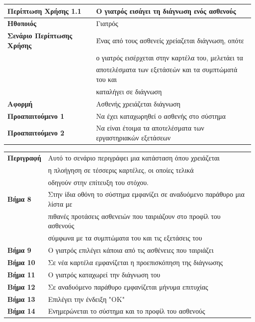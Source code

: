 \documentclass{article}
\newcommand\T{\rule{0pt}{2.6ex}}       %
\newcommand\B{\rule[-1.2ex]{0pt}{0pt}}
\begin{document}
 \begin{center}
     \begin{tabular}{|l|l|}
     \hline
      \textbf{Περίπτωση Χρήσης 1.1} & Ο γιατρός εισάγει τη διάγνωση ενός ασθενούς \T\B \\ 
      \hline
      \textbf{Ηθοποιός} & Γιατρός \T\B \\
      \hline
      \textbf{Σενάριο Περίπτωσης Χρήσης} & Ένας από τους ασθενείς χρείαζεται διάγνωση, οπότε \T\\& ο γιατρός εισέρχεται στην καρτέλα του, μελετάει τα\\& αποτελέσματα των εξετάσεών και τα συμπτώματά του και \\& καταλήγει σε διάγνωση \B \\
      \hline
      \textbf{Αφορμή} & Ασθενής χρειάζεται διάγνωση \T\B \\
      \hline
      \textbf{Προαπαιτούμενο 1} & Να έχει καταχωρηθεί ο ασθενής στο σύστημα \T\B \\
      \hline
      \textbf{Προαπαιτούμενο 2} & Να είναι έτοιμα τα αποτελέσματα των εργαστηριακών εξετάσεων \T\B \\
      \hline
     \end{tabular}
 \end{center}
 
  \vspace{0.2cm}
 
 \begin{center}
     \begin{tabular}{|l|l|}
     \hline
      \textbf{Περιγραφή} & Αυτό το σενάριο περιγράφει μια κατάσταση όπου χρειάζεται \T \\& η πλοήγηση σε τέσσερις καρτέλες, οι οποίες τελικά\\& οδηγούν στην επίτευξη του στόχου. \B \\ 
      \hline
      \textbf{Βήμα 8} & Στην ίδια οθόνη το σύστημα εμφανίζει σε αναδυόμενο παράθυρο μια λίστα με \T \\& πιθανές προτάσεις ασθενειών που ταιριάζουν στο προφίλ του ασθενούς \\& σύμφωνα με τα συμπτώματα του και τις εξετάσεις του \B \\
      \hline
      \textbf{Βήμα 9} & Ο γιατρός επιλέγει κάποια από τις ασθένειες που ταιριάζει  \T\B \\
      \hline
      \textbf{Βήμα 10} & Σε νέα καρτέλα εμφανίζεται η προεπισκόπηση της διάγνωσης \T\B \\
      \hline
      \textbf{Βήμα 11} & Ο γιατρός καταχωρεί την διάγνωση του \T\B \\
      \hline
      \textbf{Βήμα 12} & Σε αναδυόμενο παράθυρο εμφανίζεται μήνυμα επιτυχίας \T\B \\
      \hline    
      \textbf{Βήμα 13} & Επιλέγει την ένδειξη "ΟΚ" \T\B \\ 
      \hline
      \textbf{Βήμα 14} & Ενημερώνεται το σύστημα και το προφίλ του ασθενούς \T\B \\
      \hline
    \end{tabular}
 \end{center}
 
\end{document}
